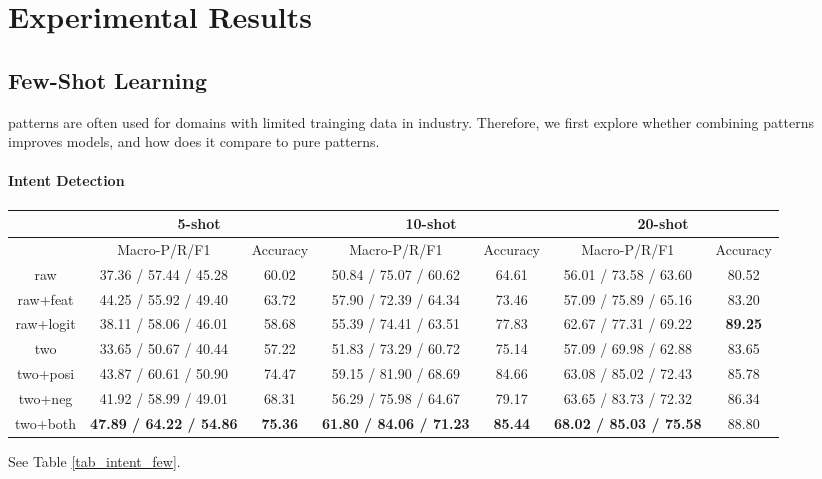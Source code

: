 \section{Experimental Results}
\label{sec:experiments}

\subsection{Few-Shot Learning}
\RE patterns are often used for domains with limited trainging data in industry. Therefore, we first explore whether combining \RE patterns improves \NN models, and how does it compare to pure \RE patterns.

\paragraph{Intent Detection}

\begin{table*}
\setlength{\tabcolsep}{0.23em}
\centering
\small{
\begin{tabular}{|c|c|c|c|c|c|c|}

\hline
  & \multicolumn{2}{|c|}{5-shot} & \multicolumn{2}{|c|}{10-shot} & \multicolumn{2}{|c|}{20-shot}  \\
 \hline
  & Macro-P/R/F1 & Accuracy & Macro-P/R/F1 & Accuracy  & Macro-P/R/F1 & Accuracy   \\
\hline
raw & 37.36 / 57.44 / 45.28 & 60.02 & 50.84 / 75.07 / 60.62 & 64.61 & 56.01 / 73.58 / 63.60 & 80.52  \\
\hline
raw+feat & 44.25 / 55.92 / 49.40 & 63.72 & 57.90 / 72.39 / 64.34 & 73.46 & 57.09 / 75.89 / 65.16 & 83.20   \\
\hline
raw+logit & 38.11 / 58.06 / 46.01 & 58.68 & 55.39 / 74.41 / 63.51 & 77.83 & 62.67 / 77.31 / 69.22 & \textbf{89.25} \\
\hline
two & 33.65 / 50.67 / 40.44 & 57.22 & 51.83 / 73.29 / 60.72 & 75.14 & 57.09 / 69.98 / 62.88 & 83.65  \\
\hline
two+posi & 43.87 / 60.61 / 50.90 & 74.47 & 59.15 / 81.90 / 68.69 & 84.66 & 63.08 / 85.02 / 72.43 & 85.78  \\
\hline
two+neg & 41.92 / 58.99 / 49.01 & 68.31 & 56.29 / 75.98 / 64.67 & 79.17 & 63.65 / 83.73 / 72.32 & 86.34   \\
\hline
two+both & \textbf{47.89 / 64.22 / 54.86} & \textbf{75.36} & \textbf{61.80 / 84.06 / 71.23} & \textbf{85.44} & \textbf{68.02 / 85.03 / 75.58} & 88.80   \\
\hline

\end{tabular}
}
\caption{Intent Detection Result on Few-Shot Data}
\label{tab_intent_few}
\end{table*}
See Table \ref{tab_intent_few}. 

